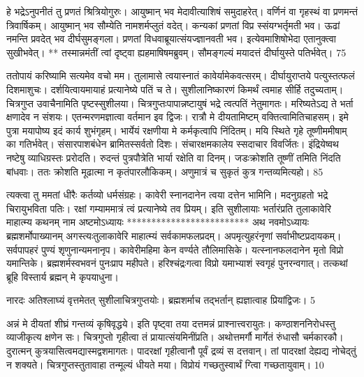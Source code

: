 हे भद्रेऽनुपनीतं तु प्रणतं श्रित्रियोगुरुः।
आयुष्मान् भव मेदावीत्याशिषं समुदाहरेत्।
वर्णिनं वा गृहस्थं वा प्रणमन्तं त्रिवार्षिकम्।
आयुष्मान् भव सौम्येति नामशर्मप्लुतं वदेत्।
कन्यकां प्रणतां विप्र स्संयग्भर्तृमती भव।
ऊढां नमन्ति प्रवदेत् भव दीर्घसुमङ्गला।
प्रणतां विधवाब्रूयात्संयज्ज्ञानवती भव।
इत्येवमाशिषोभेदा एतानुक्त्वा सुखीभवेत्।
** तस्मान्नमंतीं त्वां दृष्ट्वा ह्यहमाषिषमब्रुवम्।
सौमङ्गल्यं मयादत्तं दीर्घायुस्ते पतिर्भवेत्।
75


ततोपायं करिष्यामि सत्यमेव वचो मम।
तुलामासे त्वयास्नातं कावेर्यामेकवत्सरम्।
दीर्घायुराप्तये पत्युस्तत्फलं दिशमाशुचः।
दर्शयित्वायमायाहं प्रत्यानेष्ये पतिं च ते।
सुशीलानिष्कारणं किमर्थं त्वमाह सीर्हि तदुच्यताम्।
चित्रगुप्त उवाचैनामिति पृष्टस्सुशीलया।
चित्रगुप्तःपापान्नष्टायुषं भद्रे त्वत्पतिं नेतुमागतः।
मरिष्यतेऽद्य ते भर्ता क्षणादेव न संशयः।
एतन्मरणमज्ञात्वा वर्तमान इव द्विजः।
रात्रौ मे दीयतामिष्टम् वक्तित्वामितिचाहसम्।
इमे पुत्रा मयापोष्य इदं कार्य शुभंगृहम्।
भार्येयं रक्षणीया मे कर्मकृत्वापि निंदितम्।
मयि स्थिते गृहे तूष्णीममीषाम् का गतिर्भवेत्।
संसारपाशबंधेन ब्रामितस्सर्वतो दिशः।
संचारक्षमकालेय स्सदाचार विवर्जितः।
इंद्रियेष्वथ नष्टेषु व्याधिग्रस्तः प्ररोदति।
रुदन्तं पुत्रपौत्रेति भार्या रक्षेति वा दिनम्।
जडःक्रोशति तूष्णीं तमिति निंदति बांधवाः।
ततः क्रोशति मूढात्मा न कृतंपारलौकिकम्।
अणुमात्रं च सुकृतं कुत्र गन्तव्यमित्यहो।
85


त्यक्त्वा तु ममतां धीरैः कर्तव्यो धर्मसंग्रहः।
कावेरी स्नानदानेन त्वया दत्तेन भामिनि।
मदनुग्रहतो भद्रे चिरायुभविता पतिः।
रक्षां गम्याममात्रं त्वं प्रत्यानेष्ये तव प्रियम्।
इति सुशीलायाः भर्तारंप्रति तुलाकावेरि माहात्म्य
कथनम् नाम अष्टमोऽध्यायः
*************************
अथ नवमोऽध्यायः
ब्रह्मशर्मोपाख्यानम् अगस्त्यःतुलाकावेरि माहात्म्यं सर्वकामफलप्रदम्।
अपमृत्युहरंनृणां सर्वाभीष्टप्रदायकम्।
सर्वपापहरं पुण्यं शृणुनान्यमनानृप।
कावेरीमहिमा केन वर्ण्यते तौलिमासिके।
यत्स्नानफलदानेन मृतो विप्रो यमान्तिके।
ब्रह्मशर्मस्वभवनं पुनःप्राप महीपते।
हरिश्चंद्रःगत्वा विप्रो यमाभ्याशं स्वगृहं पुनरन्वगात्।
तत्कथां ब्रूहि विस्तार्य ब्रह्मन् मे कृपयाधुना।

नारदः
अतिश्लाघ्यं वृत्तमेतत् सुशीलाचित्रगुप्तयोः।
ब्रह्मशर्माच तद्भर्तान् ह्यज्ञात्वाह प्रियांद्विजः।
5


अन्नं मे दीयतां शीघ्रं गन्तव्यं कृषिवृद्धये।
इति पृष्ट्वा तया दत्तमन्नं प्राश्नात्त्वरायुतः।
कण्ठाशननिरोधस्तु व्याजीकृत्य क्षणेन सः।
चित्रगुप्तो गृहीत्वा तं प्रायात्संयमिनींप्रति।
अथोत्तमर्गौ मार्गेतं रुंधासौ चर्मकारकौ।
दुरात्मन् कुत्रयासित्वमद्यास्मद्वशमागतः।
पादरक्षां गृहीत्वानौ पूर्वं द्रव्यं स दत्तवान्।
तां पादरक्षां देह्यद्य नोचेद्तुं न शक्यते।
चित्रगुप्तस्तुतावाहा तन्मूल्यं धीयते मया।
विप्रोयं गच्छतुस्वार्थं ग्त्विा गच्छतायुवाम्।
10

